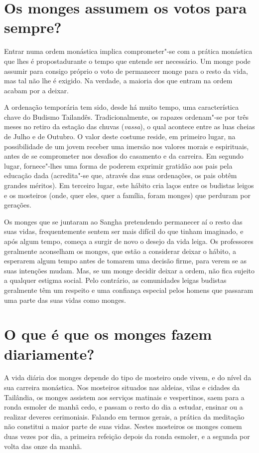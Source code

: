 \section{Os monges assumem os votos para sempre?}

Entrar numa ordem monástica implica comprometer"-se com a prática
monástica que lhes é propostadurante o tempo que entende ser necessário.
Um monge pode assumir para consigo próprio o voto de permanecer monge
para o resto da vida, mas tal não lhe é exigido. Na verdade, a maioria
dos que entram na ordem acabam por a deixar.

A ordenação temporária tem sido, desde há muito tempo, uma
característica chave do Budismo Tailandês. Tradicionalmente, os rapazes
ordenam"-se por três meses no retiro da estação das chuvas
(\emph{vassa}), o qual acontece entre as luas cheias de Julho e de
Outubro. O valor deste costume reside, em primeiro lugar, na
possibilidade de um jovem receber uma imersão nos valores morais e
espirituais, antes de se comprometer nos desafios do casamento e da
carreira. Em segundo lugar, fornece"-lhes uma forma de poderem exprimir
gratidão aos pais pela educação dada (acredita"-se que, através das suas
ordenações, os pais obtêm grandes méritos). Em terceiro lugar, este
hábito cria laços entre os budistas leigos e os mosteiros (onde, quer
eles, quer a família, foram monges) que perduram por gerações.

Os monges que se juntaram ao Sangha pretendendo permanecer aí o resto
das suas vidas, frequentemente sentem ser mais difícil do que tinham
imaginado, e após algum tempo, começa a surgir de novo o desejo da vida
leiga. Os professores geralmente aconselham os monges, que estão a
considerar deixar o hábito, a esperarem algum tempo antes de tomarem uma
decisão firme, para verem se as suas intenções mudam. Mas, se um monge
decidir deixar a ordem, não fica sujeito a qualquer estigma social. Pelo
contrário, as comunidades leigas budistas geralmente têm um respeito e
uma confiança especial pelos homens que passaram uma parte das suas
vidas como monges.

\section{O que é que os monges fazem diariamente?}

A vida diária dos monges depende do tipo de mosteiro onde vivem, e do
nível da sua carreira monástica. Nos mosteiros situados nas aldeias,
vilas e cidades da Tailândia, os monges assistem aos serviços matinais e
vespertinos, saem para a ronda esmoler de manhã cedo, e passam o resto
do dia a estudar, ensinar ou a realizar deveres cerimoniais. Falando em
termos gerais, a prática da meditação não constitui a maior parte de
suas vidas. Nestes mosteiros os monges comem duas vezes por dia, a
primeira refeição depois da ronda esmoler, e a segunda por volta das
onze da manhã.

